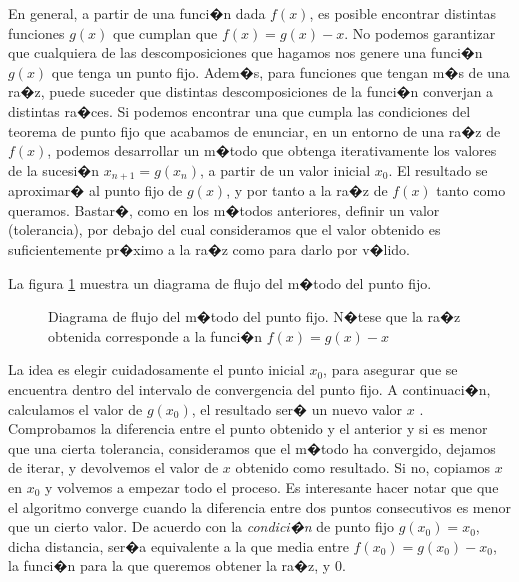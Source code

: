 En general, a partir de una funci�n dada $f(x)$, es posible encontrar distintas funciones $g(x)$ que cumplan que $f(x)=g(x)-x$. No podemos garantizar que cualquiera de las descomposiciones que hagamos nos genere una funci�n $g(x)$ que tenga un punto fijo. 
Adem�s, para funciones que tengan m�s de una ra�z, puede suceder que distintas descomposiciones de la funci�n converjan a distintas ra�ces.
Si podemos encontrar una que cumpla las condiciones del teorema de punto fijo que acabamos de enunciar, en un entorno de una ra�z de $f(x)$, podemos desarrollar un m�todo que obtenga iterativamente los valores de la sucesi�n   $x_{n+1}=g(x_n)$, a partir de un valor inicial $x_0$.  El resultado se aproximar� al punto fijo de $g(x)$, y por tanto a la ra�z de $f(x)$ tanto como queramos. Bastar�, como   en los m�todos anteriores, definir un valor (tolerancia), por debajo del cual consideramos que el valor obtenido es suficientemente pr�ximo a  la ra�z como para darlo por v�lido. 

La figura \ref{fig:pfijo1} muestra un diagrama de flujo del m�todo del punto fijo. 


\begin{figure}[h]
\centering
{}
\caption{Diagrama de flujo del m�todo del punto fijo. N�tese que la ra�z obtenida corresponde a la funci�n $f(x)=g(x)-x$}
\label{fig:pfijo1}
\end{figure}

 La idea es elegir cuidadosamente el punto inicial $x_0$, para asegurar que se encuentra dentro del intervalo de convergencia del punto fijo.  A continuaci�n, calculamos el valor de $g(x_0)$, el resultado ser� un nuevo valor  $x$ .  Comprobamos la diferencia entre el punto obtenido y el anterior y si es menor que una cierta tolerancia,  consideramos que el m�todo ha convergido, dejamos de iterar, y devolvemos el valor de $x$ obtenido como resultado. Si no, copiamos $x$ en $x_0$ y volvemos a empezar todo el proceso. Es interesante hacer notar que que el algoritmo converge cuando la diferencia entre dos puntos consecutivos es menor que un cierto valor.  De acuerdo con la \emph{condici�n } de punto fijo $g(x_0)=x_0$, dicha distancia, ser�a equivalente a la que media entre $f(x_0)=g(x_0)-x_0$, la funci�n para la que queremos obtener la ra�z,   y $0$.

